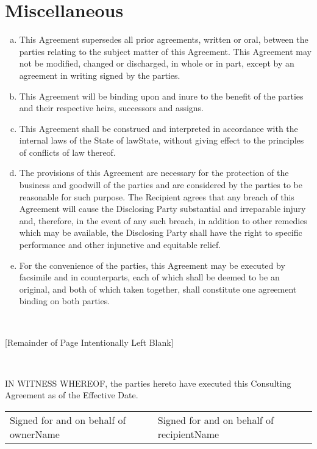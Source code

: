 \documentclass[12pt]{article}
\newcommand{\VAR}[1]{{\color{blue}#1}}
\newcommand{\BLOCK}[1]{~\newline{ \color{red}#1 }}
\begin{document}
\section{Miscellaneous}
\begin{enumerate}[a)]
\item This Agreement supersedes all prior agreements, written or oral, between the parties relating to the subject matter of this Agreement.  This Agreement may not be modified, changed or discharged, in whole or in part, except by an agreement in writing signed by the parties.
\item This Agreement will be binding upon and inure to the benefit of the parties and their respective heirs, successors and assigns.
\item This Agreement shall be construed and interpreted in accordance with the internal laws of the State of \VAR{lawState}, without giving effect to the principles of conflicts of law thereof.
\item The provisions of this Agreement are necessary for the protection of the business and goodwill of the parties and are considered by the parties to be reasonable for such purpose.  The Recipient agrees that any breach of this Agreement will cause the Disclosing Party substantial and irreparable injury and, therefore, in the event of any such breach, in addition to other remedies which may be available, the Disclosing Party shall have the right to specific performance and other injunctive and equitable relief.
\item For the convenience of the parties, this Agreement may be executed by facsimile and in counterparts, each of which shall be deemed to be an original, and both of which taken together, shall constitute one agreement binding on both parties.
\end{enumerate}

\BLOCK{if toPdf}
\vspace{1cm}
\begin{center}
[Remainder of Page Intentionally Left Blank]
\end{center}
\newpage
\BLOCK{else}
\vspace{4cm}
\BLOCK{endif}

IN WITNESS WHEREOF, the parties hereto have executed this Consulting Agreement as of the Effective Date.

\renewcommand{\arraystretch}{2}
\setlength\parindent{0pt}

\begin{tabular}{p{.5\linewidth}p{.5\linewidth}}
    Signed for and on behalf of \VAR{ownerName}
    & Signed for and on behalf of \VAR{recipientName}
\end{tabular}
\end{document}
